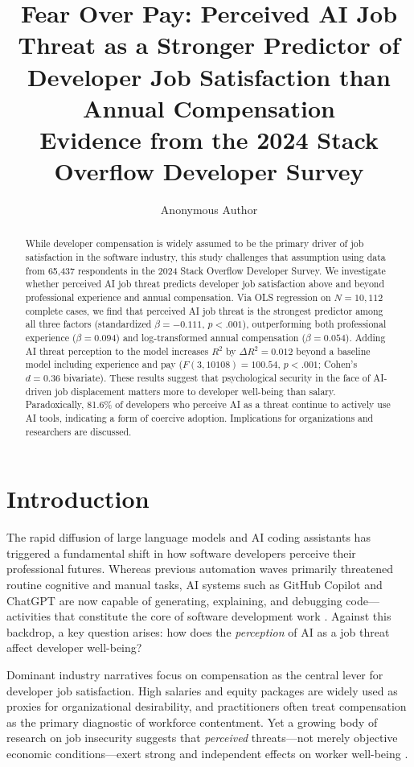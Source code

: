 \documentclass[11pt]{article}
\title{\textbf{Fear Over Pay: Perceived AI Job Threat as a Stronger Predictor of\\Developer Job Satisfaction than Annual Compensation}\\[0.4em]
\large Evidence from the 2024 Stack Overflow Developer Survey}
\author{Anonymous Author}
\date{}
\begin{document}
\maketitle

\begin{abstract}
While developer compensation is widely assumed to be the primary driver of job satisfaction
in the software industry, this study challenges that assumption using data from 65{,}437
respondents in the 2024 Stack Overflow Developer Survey. We investigate whether perceived
AI job threat predicts developer job satisfaction above and beyond professional experience
and annual compensation. Via OLS regression on $N = 10{,}112$ complete cases, we find that
perceived AI job threat is the strongest predictor among all three factors (standardized
$\beta = {-}0.111$, $p < .001$), outperforming both professional experience ($\beta = 0.094$)
and log-transformed annual compensation ($\beta = 0.054$). Adding AI threat perception to
the model increases $R^2$ by $\Delta R^2 = 0.012$ beyond a baseline model including
experience and pay ($F(3, 10108) = 100.54$, $p < .001$; Cohen's $d = 0.36$ bivariate).
These results suggest that psychological security in the face of AI-driven job displacement
matters more to developer well-being than salary. Paradoxically, 81.6\% of developers who
perceive AI as a threat continue to actively use AI tools, indicating a form of coercive
adoption. Implications for organizations and researchers are discussed.
\end{abstract}

\section{Introduction}

The rapid diffusion of large language models and AI coding assistants has triggered a
fundamental shift in how software developers perceive their professional futures. Whereas
previous automation waves primarily threatened routine cognitive and manual tasks, AI
systems such as GitHub Copilot and ChatGPT are now capable of generating, explaining, and
debugging code---activities that constitute the core of software development work
\citep{constantinides2025}. Against this backdrop, a key question arises: how does the
\emph{perception} of AI as a job threat affect developer well-being?

Dominant industry narratives focus on compensation as the central lever for developer
job satisfaction. High salaries and equity packages are widely used as proxies for
organizational desirability, and practitioners often treat compensation as the primary
diagnostic of workforce contentment. Yet a growing body of research on job insecurity
suggests that \emph{perceived} threats---not merely objective economic conditions---exert
strong and independent effects on worker well-being \citep{ghosh2024, sadeghi2024,
martinez2025, farooqi2026}.
\end{document}

